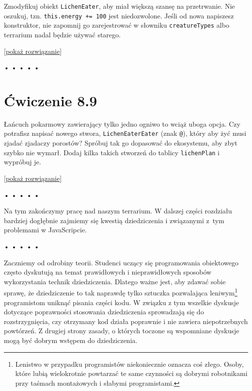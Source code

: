     
Zmodyfikuj obiekt \texttt{LichenEater}, aby miał większą szansę na przetrwanie. Nie oszukuj, tzn. \texttt{this.energy += 100} jest niedozwolone. Jeśli od nowa napiszesz konstruktor, nie zapomnij go zarejestrować w słowniku \texttt{creatureTypes} albo terrarium nadal będzie używać starego.

  
[\hyperref[sol:8.8]{pokaż rozwiązanie}]
  


\begin{center}
• • • • •
\end{center}

  
\section*{Ćwiczenie 8.9}
\label{sec:8.9}
  
    
Łańcuch pokarmowy zawierający tylko jedno ogniwo to wciąż uboga opcja. Czy potrafisz napisać nowego stwora, \texttt{LichenEaterEater} (znak \texttt{@}), który aby żyć musi zjadać zjadaczy porostów? Spróbuj tak go dopasować do ekosystemu, aby zbyt szybko nie wymarł. Dodaj kilka takich stworzeń do tablicy \texttt{lichenPlan} i wypróbuj je.

  
[\hyperref[sol:8.9]{pokaż rozwiązanie}]
  


\begin{center}
• • • • •
\end{center}

  
Na tym zakończymy pracę nad naszym terrarium. W dalszej części rozdziału bardziej dogłębnie zajmiemy się kwestią dziedziczenia i związanymi z~tym problemami w JavaScripcie.



\begin{center}
• • • • •
\end{center}

  
Zaczniemy od odrobiny teorii. Studenci uczący się programowania obiektowego często dyskutują na temat prawidłowych i nieprawidłowych sposobów wykorzystania technik dziedziczenia. Dlatego ważne jest, aby zdawać sobie sprawę, że dziedziczenie to tak naprawdę tylko sztuczka pozwalająca leniwym\footnote{Lenistwo w przypadku programistów niekoniecznie oznacza coś złego. Osoby, które lubią wielokrotnie powtarzać te same czynności są dobrymi robotnikami przy taśmach montażowych i słabymi programistami.} programistom uniknąć pisania części kodu. W związku z tym wszelkie dyskusje dotyczące poprawności stosowania dziedziczenia sprowadzają się do rozstrzygnięcia, czy otrzymany kod działa poprawnie i nie zawiera niepotrzebnych powtórzeń. Z drugiej strony zasady, o których toczone są wspomniane dyskusje mogą być dobrym wstępem do dziedziczenia.

